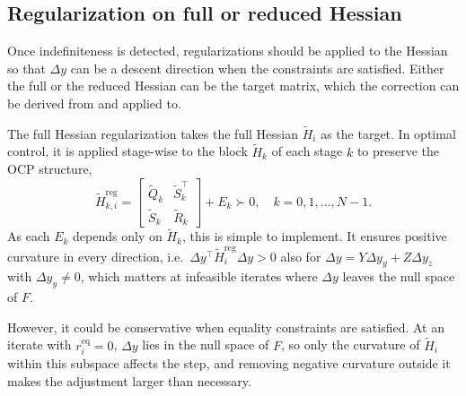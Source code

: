 \documentclass[class=scrbook, crop=false]{standalone}
\begin{document}
\subsection{Regularization on full or reduced Hessian}
\label{subsec:full_hessian}
Once indefiniteness is detected, 
regularizations should be applied to the Hessian 
so that $\Delta y$ can be a descent direction when the constraints are satisfied.
Either the full or the reduced Hessian can be the target matrix, 
which the correction can be derived from and applied to.

The full Hessian regularization takes the full Hessian $\tilde{H}_i$ as the target.
In optimal control, it is applied stage-wise to the block $\tilde{H}_k$ of each stage $k$ to preserve the \gls{OCP} structure,
\begin{equation}
    \label{eq:regularized_system}
    \tilde{H}_{k,i}^\mathrm{reg} =  
    \begin{bmatrix}
    \tilde{Q}_k & \tilde{S}_k^\top \\
    \tilde{S}_k & \tilde{R}_k
    \end{bmatrix} + E_k \succ 0, \quad k = 0, 1, \ldots, N-1.
\end{equation}
As each $E_k$ depends only on $\tilde{H}_k$, this is simple to implement.
It ensures positive curvature in every direction, 
i.e.\ $\Delta y^\top \tilde{H}_i^\mathrm{reg} \Delta y > 0$ 
also for $\Delta y = Y \Delta y_y + Z \Delta y_z$ with $\Delta y_y \neq 0$, 
which matters at infeasible iterates where $\Delta y$ leaves the null space of $F$.

However, it could be conservative when equality constraints are satisfied.
At an iterate with $r_i^{\mathrm{eq}} = 0$, $\Delta y$ lies in the null space of $F$,
so only the curvature of $\tilde{H}_i$ within this subspace affects the step,
and removing negative curvature outside it makes the adjustment larger than necessary.
\end{document}
